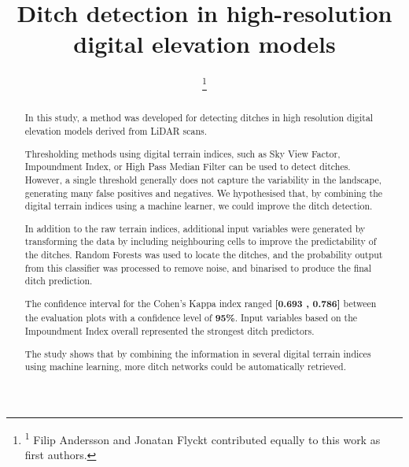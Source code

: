 \documentclass[]{interact}
\theoremstyle{plain}%
\theoremstyle{definition}
\theoremstyle{remark}
\begin{document}
\title{Ditch detection in high-resolution digital elevation models}

\author{
 
\footnote{\textsuperscript{1} Filip Andersson and Jonatan Flyckt contributed equally to this work as first authors.}}

\maketitle

\begin{abstract}
In this study, a method was developed for detecting ditches in high resolution digital elevation models derived from LiDAR scans.

Thresholding methods using digital terrain indices, such as Sky View Factor, Impoundment Index, or High Pass Median Filter can be used to detect ditches. However, a single threshold generally does not capture the variability in the landscape, generating many false positives and negatives. We hypothesised that, by combining the digital terrain indices using a machine learner, we could improve the ditch detection.

In addition to the raw terrain indices, additional input variables were generated by transforming the data by including neighbouring cells to improve the predictability of the ditches. Random Forests was used to locate the ditches, and the probability output from this classifier was processed to remove noise, and binarised to produce the final ditch prediction.

The confidence interval for the Cohen's Kappa index ranged \textbf{[0.693 , 0.786]} between the evaluation plots with a confidence level of \textbf{95\%}. Input variables based on the Impoundment Index overall represented the strongest ditch predictors.

The study shows that by combining the information in several digital terrain indices using machine learning, more ditch networks could be automatically retrieved.
\end{abstract}
\end{document}
